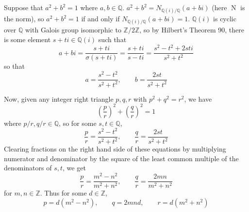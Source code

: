 \documentclass[12pt]{article}
\newcommand{\Rats}{\mathbb{Q}}
\newcommand{\Ints}{\mathbb{Z}}
\DeclareMathOperator{\N}{N}
\begin{document}
Suppose that $a^2+b^2=1$ where $a,b\in\Rats$. $a^2+b^2=N_{\Rats(i)/\Rats}(a+bi)$ (here $\N$ is the norm), so $a^2+b^2=1$ if and only if $N_{\Rats(i)/\Rats}(a+bi)=1$. $\Rats(i)$ is cyclic over $\Rats$ with Galois group isomorphic to $\Ints/2\Ints$, so by Hilbert's Theorem 90, there is some element $s+ti\in\Rats(i)$ such that
\[a+bi=\frac{s+ti}{\sigma(s+ti)}=\frac{s+ti}{s-ti}=\frac{s^2-t^2+2sti}{s^2+t^2}\]
so that
\[a=\frac{s^2-t^2}{s^2+t^2}, \qquad b=\frac{2st}{s^2+t^2}\]

Now, given any integer right triangle $p,q,r$ with $p^2+q^2=r^2$, we have
\[\left(\frac{p}{r}\right)^2+\left(\frac{q}{r}\right)^2=1\]
where $p/r, q/r\in\Rats$, so for some $s,t\in\Rats$,
\[\frac{p}{r}=\frac{s^2-t^2}{s^2+t^2}, \qquad \frac{q}{r}=\frac{2st}{s^2+t^2}\]
Clearing fractions on the right hand side of these equations by multiplying numerator and denominator by the square of the least common multiple of the denominators of $s, t$, we get
\[\frac{p}{r}=\frac{m^2-n^2}{m^2+n^2}, \qquad \frac{q}{r}=\frac{2mn}{m^2+n^2}\]
for $m,n\in\Ints$. Thus for some $d\in\Ints$,
\[p=d(m^2-n^2), \qquad q=2mnd, \qquad r=d(m^2+n^2)\]

\end{document}
